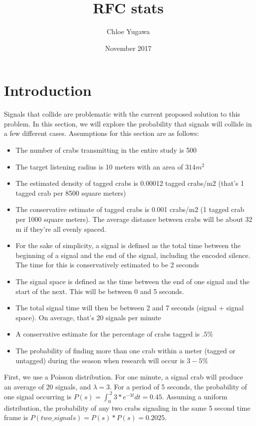 \documentclass{article}
\title{RFC stats}
\author{Chloe Yugawa}
\date{November 2017}
\begin{document}
\maketitle

\section{Introduction}
Signals that collide are problematic with the current proposed solution to this problem. In this section, we will explore the probability that signals will collide in a few different cases. Assumptions for this section are as follows:
\begin{itemize}
\item The number of crabs transmitting in the entire study is 500
\item The target listening radius is 10 meters with an area of $314m^2$
\item The estimated density of tagged crabs is 0.00012 tagged crabs/m2 (that's 1 tagged crab per 8500 square meters)
\item The conservative estimate of tagged crabs is 0.001 crabs/m2 (1 tagged crab per 1000 square meters).  The average distance between crabs will be about 32 m if they're all evenly spaced.
\item For the sake of simplicity, a signal is defined as the total time between the beginning of a signal and the end of the signal, including the encoded silence. The time for this is conservatively estimated to be 2 seconds
\item The signal space is defined as the time between the end of one signal and the start of the next. This will be between 0 and 5 seconds.
\item The total signal time will then be between 2 and 7 seconds (signal + signal space). On average, that's 20 signals per minute
\item A conservative estimate for the percentage of crabs tagged is $.5\% $
\item The probability of finding more than one crab within a meter (tagged or untagged) during the season when research will occur is $3-5\%$

\end{itemize}


\newline \newline

First, we use a Poisson distribution. For one minute, a signal crab will produce an average of 20 signals, and $\lambda = 3$. For a period of 5 seconds, the probability of one signal occurring is $P(s)=\int_{0}^{.2}3*e^{-3t}dt=0.45$. Assuming a uniform distribution, the probability of any two crabs signaling in the same 5 second time frame is $P(two\_signals)=P(s)*P(s) = 0.2025$. \newline 
\end{document}
